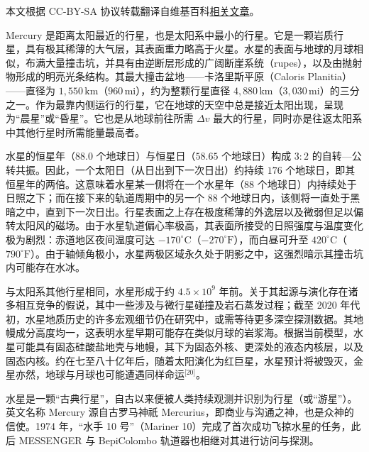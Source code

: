 
本文根据 CC-BY-SA 协议转载翻译自维基百科\href{https://en.wikipedia.org/wiki/Mercury_(planet)}{相关文章}。

Mercury 是距离太阳最近的行星，也是太阳系中最小的行星。它是一颗岩质行星，具有极其稀薄的大气层，其表面重力略高于火星。水星的表面与地球的月球相似，布满大量撞击坑，并具有由逆断层形成的广阔断崖系统（rupes），以及由抛射物形成的明亮光条结构。其最大撞击盆地——卡洛里斯平原（Caloris Planitia）——直径为 \(1{,}550\,\mathrm{km}\)（\(960\,\mathrm{mi}\)），约为整颗行星直径 \(4{,}880\,\mathrm{km}\)（\(3{,}030\,\mathrm{mi}\)）的三分之一。作为最靠内侧运行的行星，它在地球的天空中总是接近太阳出现，呈现为“晨星”或“昏星”。它也是从地球前往所需 \(\Delta v\) 最大的行星，同时亦是往返太阳系中其他行星时所需能量最高者。

水星的恒星年（\(88.0\) 个地球日）与恒星日（\(58.65\) 个地球日）构成 \(3:2\) 的自转—公转共振。因此，一个太阳日（从日出到下一次日出）约持续 \(176\) 个地球日，即其恒星年的两倍。这意味着水星某一侧将在一个水星年（\(88\) 个地球日）内持续处于日照之下；而在接下来的轨道周期中的另一个 \(88\) 个地球日内，该侧将一直处于黑暗之中，直到下一次日出。行星表面之上存在极度稀薄的外逸层以及微弱但足以偏转太阳风的磁场。由于水星轨道偏心率极高，其表面所接受的日照强度与温度变化极为剧烈：赤道地区夜间温度可达 \(-170^{\circ}\mathrm{C}\)（\(-270^{\circ}\mathrm{F}\)），而白昼可升至 \(420^{\circ}\mathrm{C}\)（\(790^{\circ}\mathrm{F}\)）。由于轴倾角极小，水星两极区域永久处于阴影之中，这强烈暗示其撞击坑内可能存在水冰。

与太阳系其他行星相同，水星形成于约 \(4.5\times10^{9}\) 年前。关于其起源与演化存在诸多相互竞争的假说，其中一些涉及与微行星碰撞及岩石蒸发过程；截至 2020 年代初，水星地质历史的许多宏观细节仍在研究中，或需等待更多深空探测数据。其地幔成分高度均一，这表明水星早期可能存在类似月球的岩浆海。根据当前模型，水星可能具有固态硅酸盐地壳与地幔，其下为固态外核、更深处的液态内核层，以及固态内核。约在七至八十亿年后，随着太阳演化为红巨星，水星预计将被毁灭，金星亦然，地球与月球也可能遭遇同样命运\(^\text{[20]}\)。

水星是一颗“古典行星”，自古以来便被人类持续观测并识别为行星（或“游星”）。英文名称 Mercury 源自古罗马神祇 Mercurius，即商业与沟通之神，也是众神的信使。1974 年，“水手 10 号”（Mariner 10）完成了首次成功飞掠水星的任务，此后 MESSENGER 与 BepiColombo 轨道器也相继对其进行访问与探测。
